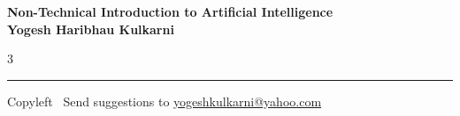 \documentclass[8pt,landscape]{article}
\begin{document}
\footnotesize


\begin{center}
\Large{\textbf{Non-Technical Introduction to Artificial Intelligence\\ Yogesh Haribhau Kulkarni}}
\end{center}

\begin{multicols}{3}

\end{multicols}

\rule{\linewidth}{0.25pt}
\scriptsize
Copyleft \textcopyleft\  Send suggestions to
\href{http://www.yogeshkulkarni.com}{yogeshkulkarni@yahoo.com}
\end{document}
